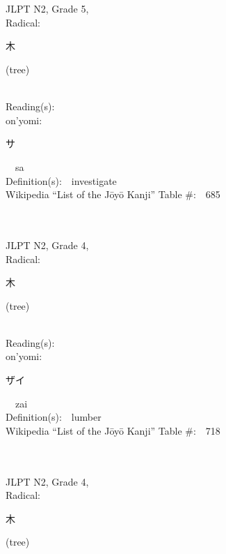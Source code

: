 \begin{multicols}{2}
\ \ \\
{\fontsize{34pt}{40pt}  }\ \ \\  %
{JLPT N2, Grade 5, \\Radical:\ \ {\begin{CJK}{UTF8}{min} 木 \end{CJK}} (tree) } \\
Reading(s):\ \ \\
{\hspace*{1em}}on'yomi:\ \ \\
{\hspace*{2em}}{\begin{CJK}{UTF8}{min} サ \end{CJK}}\ \ sa\ \ \\
Definition(s):\ \ investigate \\
Wikipedia ``List of the J\=oy\=o Kanji'' Table \#:\ \ 685 \\
\ \ \\
{\fontsize{34pt}{40pt}  }\ \ \\  %
{JLPT N2, Grade 4, \\Radical:\ \ {\begin{CJK}{UTF8}{min} 木 \end{CJK}} (tree) } \\
Reading(s):\ \ \\
{\hspace*{1em}}on'yomi:\ \ \\
{\hspace*{2em}}{\begin{CJK}{UTF8}{min} ザイ \end{CJK}}\ \ zai\ \ \\
Definition(s):\ \ lumber \\
Wikipedia ``List of the J\=oy\=o Kanji'' Table \#:\ \ 718 \\
\ \ \\
{\fontsize{34pt}{40pt}  }\ \ \\  %
{JLPT N2, Grade 4, \\Radical:\ \ {\begin{CJK}{UTF8}{min} 木 \end{CJK}} (tree) } \\

\end{multicols}
